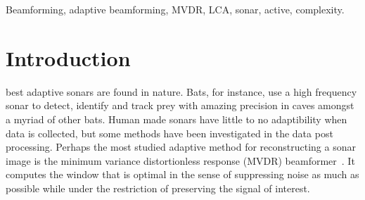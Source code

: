 \documentclass[10pt,journal,draftclsnofoot,onecolumn]{IEEEtran}
\newcommand\1{\vec 1}
\begin{document}
{\begin{abstract}
% 


\end{abstract}

\ifPeerReview\else
\begin{IEEEkeywords}\color{gray}
Beamforming, adaptive beamforming, MVDR, LCA, sonar, active, complexity.
\end{IEEEkeywords}
\fi}

\maketitle

\IEEEdisplaynotcompsoctitleabstractindextext


\IEEEpeerreviewmaketitle

\section{Introduction}


 best adaptive sonars are found in nature. Bats, for instance, use a high frequency sonar to detect, identify and track prey with amazing precision in caves amongst a myriad of other bats. Human made sonars have little to no adaptibility when data is collected, but some methods have been investigated in the data post processing. Perhaps the most studied adaptive method for reconstructing a sonar image is the minimum variance distortionless response (MVDR) beamformer~\cite{Capon1969}. It computes the window that is optimal in the sense of suppressing noise as much as possible while under the restriction of  preserving the signal of interest.
\end{document}
